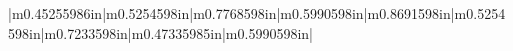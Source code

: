 \clearpage\setcounter{page}{1}\pagestyle{Standard}

\begin{flushleft}
\tablehead{}
\begin{supertabular}{|m{0.45255986in}|m{0.5254598in}|m{0.7768598in}|m{0.5990598in}|m{0.8691598in}|m{0.5254598in}|m{0.7233598in}|m{0.47335985in}|m{0.5990598in}|}
\hline
\end{supertabular}
\end{flushleft}

